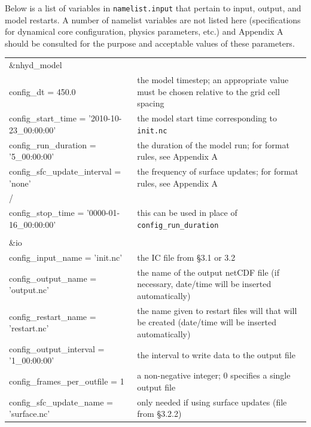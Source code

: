 \documentclass[11pt]{report}
\begin{document}
Below is a list of variables in {\tt namelist.input} that pertain to input, output, and model restarts.  A number of namelist variables are not listed here (specifications for dynamical core configuration, physics parameters, etc.) and Appendix A should be consulted for the purpose and acceptable values of these parameters.

\begin{longtable}{p{3.0in} |p{3.25in}}

\&nhyd\_model                                        & \\
   config\_dt = 450.0                                & the model timestep; an appropriate value must be chosen relative to the grid cell spacing \\
   config\_start\_time = '2010-10-23\_00:00:00'      & the model start time corresponding to {\tt init.nc}\\
   config\_run\_duration = '5\_00:00:00'             & the duration of the model run; for format rules, see Appendix A \\
   config\_sfc\_update\_interval = 'none'            & the frequency of surface updates; for format rules, see Appendix A \\
/                                                    & \\
   config\_stop\_time  = '0000-01-16\_00:00:00'      & this can be used in place of {\tt config\_run\_duration} \\
                                                     & \\
\&io                                                 & \\
   config\_input\_name = 'init.nc'                   & the IC file from \S 3.1 or 3.2 \\
   config\_output\_name = 'output.nc'                & the name of the output netCDF file (if necessary, date/time will be inserted automatically) \\
   config\_restart\_name = 'restart.nc'              & the name given to restart files will that will be created (date/time will be inserted automatically) \\
   config\_output\_interval = '1\_00:00:00'          & the interval to write data to the output file\\
   config\_frames\_per\_outfile = 1                  & a non-negative integer; 0 specifies a single output file \\
   config\_sfc\_update\_name = 'surface.nc'          & only needed if using surface updates (file from \S 3.2.2) \\

\end{longtable}
\end{document}
